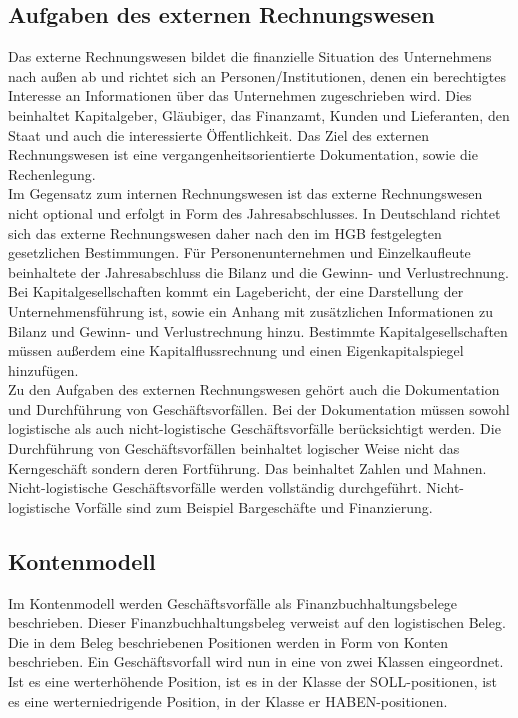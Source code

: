 \subsection{Aufgaben des externen Rechnungswesen}
Das externe Rechnungswesen bildet die finanzielle Situation des Unternehmens nach außen ab und richtet sich an Personen/Institutionen, denen ein berechtigtes Interesse an Informationen über das Unternehmen zugeschrieben wird. Dies beinhaltet Kapitalgeber, Gläubiger, das Finanzamt, Kunden und Lieferanten, den Staat und auch die interessierte Öffentlichkeit. Das Ziel des externen Rechnungswesen ist eine vergangenheitsorientierte Dokumentation, sowie die Rechenlegung. 
\\
Im Gegensatz zum internen Rechnungswesen ist das externe Rechnungswesen nicht optional und erfolgt in Form des Jahresabschlusses. In Deutschland richtet sich das externe Rechnungswesen daher nach den im HGB festgelegten gesetzlichen Bestimmungen. Für Personenunternehmen und Einzelkaufleute beinhaltete der Jahresabschluss die Bilanz und die Gewinn- und Verlustrechnung. Bei Kapitalgesellschaften kommt ein Lagebericht, der eine Darstellung der Unternehmensführung ist, sowie ein Anhang mit zusätzlichen Informationen zu Bilanz und Gewinn- und Verlustrechnung hinzu. Bestimmte Kapitalgesellschaften müssen außerdem eine Kapitalflussrechnung und einen Eigenkapitalspiegel hinzufügen.
\\
Zu den Aufgaben des externen Rechnungswesen gehört auch die Dokumentation und Durchführung von Geschäftsvorfällen. Bei der Dokumentation müssen sowohl logistische als auch nicht-logistische Geschäftsvorfälle berücksichtigt werden. Die Durchführung von Geschäftsvorfällen beinhaltet logischer Weise nicht das Kerngeschäft sondern deren Fortführung. Das beinhaltet Zahlen und Mahnen. Nicht-logistische Geschäftsvorfälle werden vollständig durchgeführt. Nicht-logistische Vorfälle sind zum Beispiel Bargeschäfte und Finanzierung.

\subsection{Kontenmodell}
Im Kontenmodell werden Geschäftsvorfälle als Finanzbuchhaltungsbelege beschrieben. Dieser Finanzbuchhaltungsbeleg verweist auf den logistischen Beleg. Die in dem Beleg beschriebenen Positionen werden in Form von Konten beschrieben. Ein Geschäftsvorfall wird nun in eine von zwei Klassen eingeordnet. Ist es eine werterhöhende Position, ist es in der Klasse der SOLL-positionen, ist es eine werterniedrigende Position, in der Klasse er HABEN-positionen.

